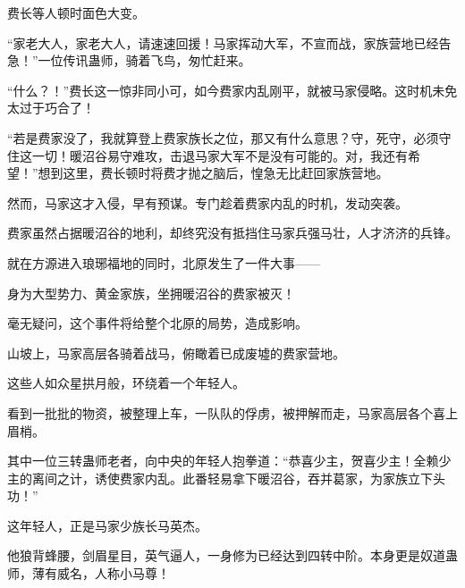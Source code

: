 \begin{this_body}
费长等人顿时面色大变。

“家老大人，家老大人，请速速回援！马家挥动大军，不宣而战，家族营地已经告急！”一位传讯蛊师，骑着飞鸟，匆忙赶来。

“什么？！”费长这一惊非同小可，如今费家内乱刚平，就被马家侵略。这时机未免太过于巧合了！

“若是费家没了，我就算登上费家族长之位，那又有什么意思？守，死守，必须守住这一切！暖沼谷易守难攻，击退马家大军不是没有可能的。对，我还有希望！”想到这里，费长顿时将费才抛之脑后，惶急无比赶回家族营地。

然而，马家这才入侵，早有预谋。专门趁着费家内乱的时机，发动突袭。

费家虽然占据暖沼谷的地利，却终究没有抵挡住马家兵强马壮，人才济济的兵锋。

就在方源进入琅琊福地的同时，北原发生了一件大事——

身为大型势力、黄金家族，坐拥暖沼谷的费家被灭！

毫无疑问，这个事件将给整个北原的局势，造成影响。

山坡上，马家高层各骑着战马，俯瞰着已成废墟的费家营地。

这些人如众星拱月般，环绕着一个年轻人。

看到一批批的物资，被整理上车，一队队的俘虏，被押解而走，马家高层各个喜上眉梢。

其中一位三转蛊师老者，向中央的年轻人抱拳道：“恭喜少主，贺喜少主！全赖少主的离间之计，诱使费家内乱。此番轻易拿下暖沼谷，吞并葛家，为家族立下头功！”

这年轻人，正是马家少族长马英杰。

他狼背蜂腰，剑眉星目，英气逼人，一身修为已经达到四转中阶。本身更是奴道蛊师，薄有威名，人称小马尊！

\end{this_body}

